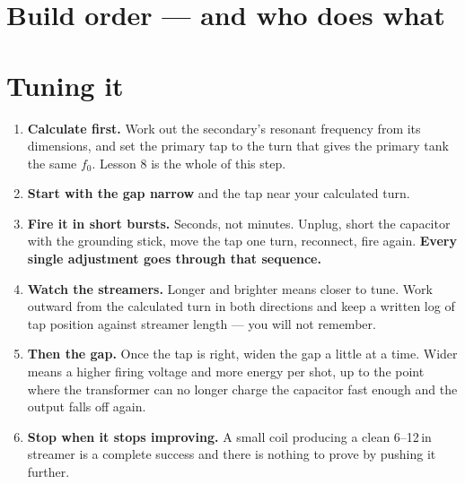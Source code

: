 \section{Build order --- and who does what}
\begin{telosfacts}[0.20]
\end{telosfacts}

\section{Tuning it}
\begin{enumerate}
\item \textbf{Calculate first.} Work out the secondary's resonant frequency from
  its dimensions, and set the primary tap to the turn that gives the primary
  tank the same $f_0$. Lesson 8 is the whole of this step.
\item \textbf{Start with the gap narrow} and the tap near your calculated turn.
\item \textbf{Fire it in short bursts.} Seconds, not minutes. Unplug, short the
  capacitor with the grounding stick, move the tap one turn, reconnect, fire
  again. \textbf{Every single adjustment goes through that sequence.}
\item \textbf{Watch the streamers.} Longer and brighter means closer to tune.
  Work outward from the calculated turn in both directions and keep a written
  log of tap position against streamer length --- you will not remember.
\item \textbf{Then the gap.} Once the tap is right, widen the gap a little at a
  time. Wider means a higher firing voltage and more energy per shot, up to the
  point where the transformer can no longer charge the capacitor fast enough and
  the output falls off again.
\item \textbf{Stop when it stops improving.} A small coil producing a clean
  6--12\,in streamer is a complete success and there is nothing to prove by
  pushing it further.
\end{enumerate}


